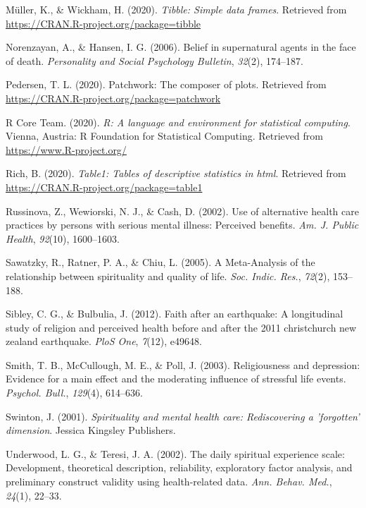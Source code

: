 \documentclass[
  english,
  man,floatsintext]{apa6}
\begin{document}
\leavevmode\hypertarget{ref-R-tibble}{}%
Müller, K., \& Wickham, H. (2020). \emph{Tibble: Simple data frames}. Retrieved from \url{https://CRAN.R-project.org/package=tibble}

\leavevmode\hypertarget{ref-norenzayan2006belief}{}%
Norenzayan, A., \& Hansen, I. G. (2006). Belief in supernatural agents in the face of death. \emph{Personality and Social Psychology Bulletin}, \emph{32}(2), 174--187.

\leavevmode\hypertarget{ref-R-patchwork}{}%
Pedersen, T. L. (2020). Patchwork: The composer of plots. Retrieved from \url{https://CRAN.R-project.org/package=patchwork}

\leavevmode\hypertarget{ref-R-base}{}%
R Core Team. (2020). \emph{R: A language and environment for statistical computing}. Vienna, Austria: R Foundation for Statistical Computing. Retrieved from \url{https://www.R-project.org/}

\leavevmode\hypertarget{ref-R-table1}{}%
Rich, B. (2020). \emph{Table1: Tables of descriptive statistics in html}. Retrieved from \url{https://CRAN.R-project.org/package=table1}

\leavevmode\hypertarget{ref-Russinova2002-rq}{}%
Russinova, Z., Wewiorski, N. J., \& Cash, D. (2002). Use of alternative health care practices by persons with serious mental illness: Perceived benefits. \emph{Am. J. Public Health}, \emph{92}(10), 1600--1603.

\leavevmode\hypertarget{ref-Sawatzky2005-rw}{}%
Sawatzky, R., Ratner, P. A., \& Chiu, L. (2005). A Meta-Analysis of the relationship between spirituality and quality of life. \emph{Soc. Indic. Res.}, \emph{72}(2), 153--188.

\leavevmode\hypertarget{ref-sibley2012faith}{}%
Sibley, C. G., \& Bulbulia, J. (2012). Faith after an earthquake: A longitudinal study of religion and perceived health before and after the 2011 christchurch new zealand earthquake. \emph{PloS One}, \emph{7}(12), e49648.

\leavevmode\hypertarget{ref-Smith2003-re}{}%
Smith, T. B., McCullough, M. E., \& Poll, J. (2003). Religiousness and depression: Evidence for a main effect and the moderating influence of stressful life events. \emph{Psychol. Bull.}, \emph{129}(4), 614--636.

\leavevmode\hypertarget{ref-Swinton2001-vr}{}%
Swinton, J. (2001). \emph{Spirituality and mental health care: Rediscovering a 'forgotten' dimension}. Jessica Kingsley Publishers.

\leavevmode\hypertarget{ref-Underwood2002-hg}{}%
Underwood, L. G., \& Teresi, J. A. (2002). The daily spiritual experience scale: Development, theoretical description, reliability, exploratory factor analysis, and preliminary construct validity using health-related data. \emph{Ann. Behav. Med.}, \emph{24}(1), 22--33.
\end{document}
